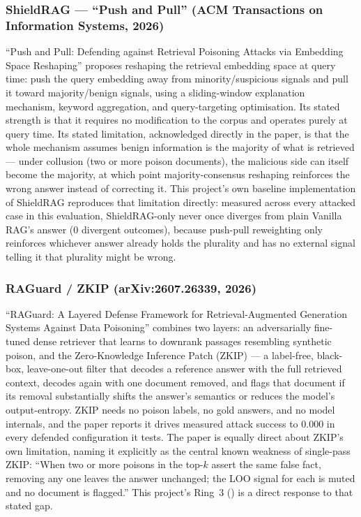 \subsubsection{ShieldRAG --- ``Push and Pull'' (ACM Transactions on Information Systems, 2026)}

``Push and Pull: Defending against Retrieval Poisoning Attacks via
Embedding Space Reshaping'' proposes reshaping the retrieval embedding
space at query time: push the query embedding away from
minority/suspicious signals and pull it toward majority/benign signals,
using a sliding-window explanation mechanism, keyword aggregation, and
query-targeting optimisation. Its stated strength is that it requires no
modification to the corpus and operates purely at query time. Its stated
limitation, acknowledged directly in the paper, is that the whole
mechanism assumes benign information is the majority of what is
retrieved --- under collusion (two or more poison documents), the
malicious side can itself become the majority, at which point
majority-consensus reshaping reinforces the wrong answer instead of
correcting it. This project's own baseline implementation of ShieldRAG
reproduces that limitation directly: measured across every attacked case
in this evaluation, ShieldRAG-only never once diverges from plain Vanilla
RAG's answer (0 divergent outcomes), because push-pull reweighting only
reinforces whichever answer already holds the plurality and has no
external signal telling it that plurality might be wrong.

\subsubsection{RAGuard / ZKIP (arXiv:2607.26339, 2026)}

``RAGuard: A Layered Defense Framework for Retrieval-Augmented Generation
Systems Against Data Poisoning'' combines two layers: an adversarially
fine-tuned dense retriever that learns to downrank passages resembling
synthetic poison, and the Zero-Knowledge Inference Patch (ZKIP) --- a
label-free, black-box, leave-one-out filter that decodes a reference
answer with the full retrieved context, decodes again with one document
removed, and flags that document if its removal substantially shifts the
answer's semantics or reduces the model's output-entropy. ZKIP needs no
poison labels, no gold answers, and no model internals, and the paper
reports it drives measured attack success to 0.000 in every defended
configuration it tests. The paper is equally direct about ZKIP's own
limitation, naming it explicitly as the central known weakness of
single-pass ZKIP: \enquote{When two or more poisons in the top-$k$ assert
the same false fact, removing any one leaves the answer unchanged; the
LOO signal for each is muted and no document is flagged.} This project's
Ring~3 () is a direct response to that stated gap.

